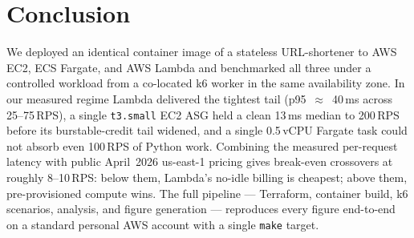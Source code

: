 \section{Conclusion}
\label{sec:conclusion}

We deployed an identical container image of a stateless URL-shortener
to AWS EC2, ECS Fargate, and AWS Lambda and benchmarked all three
under a controlled workload from a co-located k6 worker in the same
availability zone. In our measured regime Lambda delivered the
tightest tail (p95~$\approx$~40\,ms across 25--75\,RPS), a single
\texttt{t3.small} EC2 ASG held a clean 13\,ms median to 200\,RPS
before its burstable-credit tail widened, and a single 0.5\,vCPU
Fargate task could not absorb even 100\,RPS of Python work. Combining
the measured per-request latency with public April~2026 us-east-1
pricing gives break-even crossovers at roughly 8--10\,RPS: below
them, Lambda's no-idle billing is cheapest; above them, pre-provisioned
compute wins. The full pipeline --- Terraform,
container build, k6 scenarios, analysis, and figure generation ---
reproduces every figure end-to-end on a standard personal AWS account
with a single \texttt{make} target.
